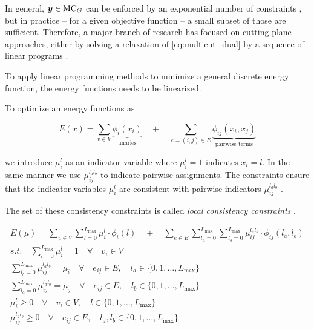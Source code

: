 In general,
$\boldsymbol y \in \text{MC}_G$ can be enforced by an exponential number of
constraints \cite{chopra_1993_mp}, but in practice
-- for a given objective function --
a small subset of those are sufficient.
Therefore, a major branch of research has focused 
on cutting plane approaches,
either by solving a relaxation of \eqref{eq:multicut_dual}
by a sequence of linear programs 
\cite{kim_2011_nips,kim_2012_ip,kappes_2013_arxiv,finley_2005_ml}.














To apply linear programming methods to minimize a general discrete energy function, 
the energy functions
needs to be linearized.

To optimize an energy functions as 

\begin{equation} \label{eq:gm_nl_energy}
    E(x) = 
     \sum_{v \in V}
    \underbrace{
        \phi_i(x_i)
    }_{\text{unaries}}
     \quad +  \quad
     \sum_{e=(i,j) \in E } 
    \underbrace{
        \phi_{ij}(x_i,x_j) 
    }_{\text{pairwise terms}}
\end{equation}

we introduce $\mu_{i}^{l}$ as an indicator variable where $\mu_{i}^{l}=1$ indicates $x_i=l$.
In the same manner we use $\mu_{ij}^{l_a l_b}$ to indicate pairwise 
assignments.
The constraints ensure that the indicator variables $\mu_{i}^{l}$ are consistent 
with pairwise indicators $\mu_{ij}^{l_a l_b}$ .

The set of these consistency constraints is 
called \emph{local consistency constraints} \citep{sontag_2010_thesis}.

\begin{align}
    E(\mu) = \sum_{v \in V} \sum_{l=0}^{L_{\text{max}}} \label{eq:gm_lp}
    \mu_{i}^{l} \cdot \phi_{i}( l)
    \quad +  \quad
    \sum_{e \in E} \sum_{l_a=0}^{L_{\text{max}}} \sum_{l_b=0}^{L_{\text{max}}}
    \mu_{ij}^{l_a l_b} \cdot \phi_{ij}( l_a,l_b) \\
    s.t. \quad
    \sum_{l=0}^{L_{\text{max}}} \mu_{i}^{l} = 1 \quad \forall \quad v_i \in V \\
    \sum_{l_b=0}^{L_{\text{max}}} \mu_{ij}^{l_a l_b} = \mu_i 
    \quad \forall \quad e_{ij} \in E, 
    \quad l_a \in \{ 0,1,\ldots,L_{\text{max}} \} \\ 
    \sum_{l_a=0}^{L_{\text{max}}} \mu_{ij}^{l_a l_b} = \mu_j 
    \quad \forall \quad e_{ij} \in E, 
    \quad l_b \in \{ 0,1,\ldots,L_{\text{max}} \} \\ 
    \mu_i^l \geq 0 \quad \forall \quad v_{i} \in V,
    \quad l \in \{ 0,1,\ldots,L_{\text{max}} \}\\
    \mu_{ij}^{l_a l_b} \geq 0 \quad \forall \quad e_{ij} \in E,
    \quad l_a,l_b \in \{ 0,1,\ldots,L_{\text{max}} \}
\end{align}

